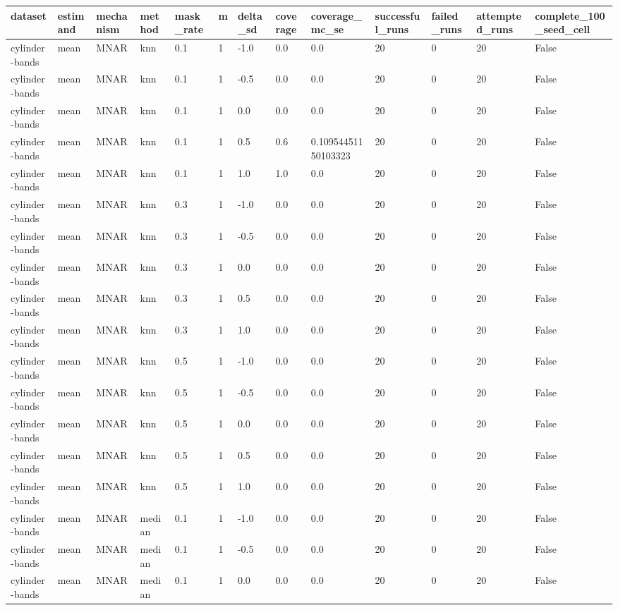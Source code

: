 \begin{tabular}{lllllllllllll}
\hline
dataset & estimand & mechanism & method & mask\_rate & m & delta\_sd & coverage & coverage\_mc\_se & successful\_runs & failed\_runs & attempted\_runs & complete\_100\_seed\_cell \\
\hline
cylinder-bands & mean & MNAR & knn & 0.1 & 1 & -1.0 & 0.0 & 0.0 & 20 & 0 & 20 & False \\
cylinder-bands & mean & MNAR & knn & 0.1 & 1 & -0.5 & 0.0 & 0.0 & 20 & 0 & 20 & False \\
cylinder-bands & mean & MNAR & knn & 0.1 & 1 & 0.0 & 0.0 & 0.0 & 20 & 0 & 20 & False \\
cylinder-bands & mean & MNAR & knn & 0.1 & 1 & 0.5 & 0.6 & 0.10954451150103323 & 20 & 0 & 20 & False \\
cylinder-bands & mean & MNAR & knn & 0.1 & 1 & 1.0 & 1.0 & 0.0 & 20 & 0 & 20 & False \\
cylinder-bands & mean & MNAR & knn & 0.3 & 1 & -1.0 & 0.0 & 0.0 & 20 & 0 & 20 & False \\
cylinder-bands & mean & MNAR & knn & 0.3 & 1 & -0.5 & 0.0 & 0.0 & 20 & 0 & 20 & False \\
cylinder-bands & mean & MNAR & knn & 0.3 & 1 & 0.0 & 0.0 & 0.0 & 20 & 0 & 20 & False \\
cylinder-bands & mean & MNAR & knn & 0.3 & 1 & 0.5 & 0.0 & 0.0 & 20 & 0 & 20 & False \\
cylinder-bands & mean & MNAR & knn & 0.3 & 1 & 1.0 & 0.0 & 0.0 & 20 & 0 & 20 & False \\
cylinder-bands & mean & MNAR & knn & 0.5 & 1 & -1.0 & 0.0 & 0.0 & 20 & 0 & 20 & False \\
cylinder-bands & mean & MNAR & knn & 0.5 & 1 & -0.5 & 0.0 & 0.0 & 20 & 0 & 20 & False \\
cylinder-bands & mean & MNAR & knn & 0.5 & 1 & 0.0 & 0.0 & 0.0 & 20 & 0 & 20 & False \\
cylinder-bands & mean & MNAR & knn & 0.5 & 1 & 0.5 & 0.0 & 0.0 & 20 & 0 & 20 & False \\
cylinder-bands & mean & MNAR & knn & 0.5 & 1 & 1.0 & 0.0 & 0.0 & 20 & 0 & 20 & False \\
cylinder-bands & mean & MNAR & median & 0.1 & 1 & -1.0 & 0.0 & 0.0 & 20 & 0 & 20 & False \\
cylinder-bands & mean & MNAR & median & 0.1 & 1 & -0.5 & 0.0 & 0.0 & 20 & 0 & 20 & False \\
cylinder-bands & mean & MNAR & median & 0.1 & 1 & 0.0 & 0.0 & 0.0 & 20 & 0 & 20 & False \\

\end{tabular}
